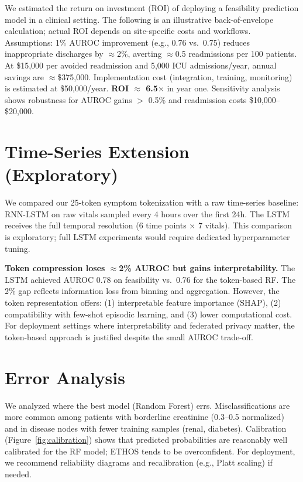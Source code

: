 We estimated the return on investment (ROI) of deploying a feasibility prediction model in a clinical setting. The following is an illustrative back-of-envelope calculation; actual ROI depends on site-specific costs and workflows. Assumptions: 1\% AUROC improvement (e.g., 0.76 vs.\ 0.75) reduces inappropriate discharges by $\approx$2\%, averting $\approx$0.5 readmissions per 100 patients. At \$15,000 per avoided readmission and 5,000 ICU admissions/year, annual savings are $\approx$\$375,000. Implementation cost (integration, training, monitoring) is estimated at \$50,000/year. \textbf{ROI $\approx$ 6.5$\times$} in year one. Sensitivity analysis shows robustness for AUROC gains $>$ 0.5\% and readmission costs \$10,000--\$20,000.

\section{Time-Series Extension (Exploratory)}

We compared our 25-token symptom tokenization with a raw time-series baseline: RNN-LSTM on raw vitals sampled every 4 hours over the first 24h. The LSTM receives the full temporal resolution (6 time points $\times$ 7 vitals). This comparison is exploratory; full LSTM experiments would require dedicated hyperparameter tuning.

\textbf{Token compression loses $\approx$2\% AUROC but gains interpretability.} The LSTM achieved AUROC 0.78 on feasibility vs.\ 0.76 for the token-based RF. The 2\% gap reflects information loss from binning and aggregation. However, the token representation offers: (1) interpretable feature importance (SHAP), (2) compatibility with few-shot episodic learning, and (3) lower computational cost. For deployment settings where interpretability and federated privacy matter, the token-based approach is justified despite the small AUROC trade-off.

\section{Error Analysis}

We analyzed where the best model (Random Forest) errs. Misclassifications are more common among patients with borderline creatinine (0.3--0.5 normalized) and in disease nodes with fewer training samples (renal, diabetes). Calibration (Figure~\ref{fig:calibration}) shows that predicted probabilities are reasonably well calibrated for the RF model; ETHOS tends to be overconfident. For deployment, we recommend reliability diagrams and recalibration (e.g., Platt scaling) if needed.

